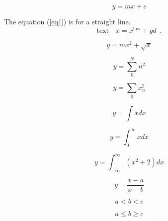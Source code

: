 \documentclass[12pt]{article}
\begin{document}
\large

 

\begin{equation}
    y=mx+c
    \label{eq1}
\end{equation}


The equation (\ref{eq1}) is for a straight line. \\



\begin{equation*}
    \mbox{text}\quad x=x^\mathrm{low}+yd \enspace . %
\end{equation*}


\begin{equation}
    y=mx^2+\sqrt{x}
    \label{eq2}
\end{equation}

\begin{equation}
    y=\sum_{0}^{N} n^2
    \label{eq3}
\end{equation}


\begin{equation}
    y=\sum_{0}x_{n}^2
    \label{eq4}
\end{equation}

\begin{equation}
    y=\int xdx
    \label{eq5}
\end{equation}


\begin{equation}
    y=\int_{0}^{\infty} xdx
\end{equation}


\begin{equation}
    y=\int_{-\infty}^{\infty} (x^2 +2) dx
    \label{eq7}
\end{equation}


\begin{equation}
    y=\frac{x-a}{x-b}
    \label{eq7}
\end{equation}

\begin{equation}
    a < b < c
    \label{eq8}
\end{equation}

\begin{equation}
    a \leq b \geq c
    \label{eq9}
\end{equation}
\end{document}
